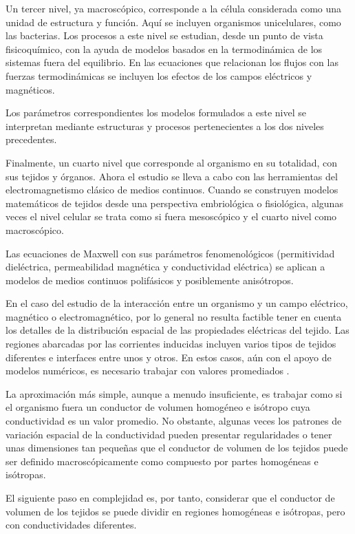 Un tercer nivel, ya macroscópico, corresponde a la célula considerada como una unidad de estructura y función. Aquí se incluyen organismos unicelulares, como las bacterias.
Los procesos a este nivel se estudian, desde un punto de vista fisicoquímico, con la ayuda de modelos basados en la termodinámica de los sistemas fuera del equilibrio.
En las ecuaciones que relacionan los flujos con las fuerzas termodinámicas se incluyen los efectos de los campos eléctricos y magnéticos.

Los parámetros correspondientes los modelos formulados a este nivel se interpretan mediante estructuras y procesos pertenecientes a los dos niveles precedentes.

Finalmente, un cuarto nivel que corresponde al organismo en su totalidad, con sus tejidos y órganos. Ahora el estudio se lleva a cabo con las herramientas del electromagnetismo clásico de medios continuos. Cuando se construyen modelos matemáticos de tejidos desde una perspectiva embriológica o fisiológica, algunas veces el nivel celular se trata como si fuera mesoscópico y el cuarto nivel como macroscópico.

Las ecuaciones de Maxwell con sus parámetros fenomenológicos (permitividad dieléctrica, permeabilidad magnética y conductividad eléctrica) se aplican a modelos de medios continuos polifásicos y posiblemente anisótropos.

En el caso del estudio de la interacción entre un organismo y un campo eléctrico, magnético o electromagnético, por lo general no resulta factible tener en cuenta los detalles de la distribución espacial de las propiedades eléctricas del tejido. Las regiones abarcadas por las corrientes inducidas incluyen varios tipos de tejidos diferentes e interfaces entre unos y otros. En estos casos, aún con el apoyo de modelos numéricos, es necesario trabajar con valores promediados \citep{Malmivuo_1995}.

La aproximación más simple, aunque a menudo insuficiente, es trabajar como si el organismo fuera un conductor de volumen homogéneo e isótropo cuya conductividad es un valor promedio. No obstante, algunas veces los patrones de variación espacial de la conductividad pueden presentar regularidades o tener unas dimensiones tan pequeñas que el conductor de volumen de los tejidos puede ser definido macroscópicamente como compuesto por partes homogéneas e isótropas.

El siguiente paso en complejidad es, por tanto, considerar que el conductor de volumen de los tejidos se puede dividir en regiones homogéneas e isótropas, pero con conductividades diferentes.

